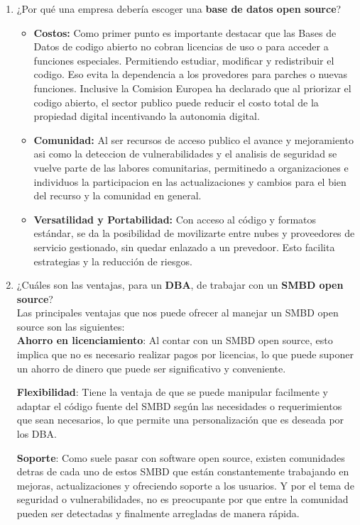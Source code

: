 \documentclass[12pt]{report}
\begin{document}
\begin{enumerate}[label=\roman*.]
\begin{enumerate}[label=\textbf{\arabic*.}, itemsep=2.0em]
  \item ¿Por qué una empresa debería escoger una \textbf{base de datos open source}?
 \begin{itemize}
      \item \textbf{Costos:}
            Como primer punto es importante destacar que las Bases de Datos de codigo abierto no cobran licencias de uso o para acceder a funciones especiales. Permitiendo estudiar, modificar y redistribuir el codigo. Eso evita la dependencia a los provedores para parches o nuevas funciones. Inclusive la Comision Europea ha declarado que al priorizar el codigo abierto, el sector publico puede reducir el costo total de la propiedad digital incentivando la autonomia digital.
        \item \textbf{Comunidad:}
            Al ser recursos de acceso publico el avance y mejoramiento asi como  la deteccion de vulnerabilidades y el analisis de seguridad se vuelve parte de las labores comunitarias, permitinedo a organizaciones e individuos la participacion en las actualizaciones y cambios para el bien del recurso y la comunidad en general.

        \item \textbf{Versatilidad y Portabilidad:}
            Con acceso al código y formatos estándar, se da la posibilidad de movilizarte entre nubes y proveedores de servicio gestionado, sin quedar enlazado a un prevedoor. Esto facilita estrategias y la reducción de riesgos.

\end{itemize}




  \item ¿Cuáles son las ventajas, para un \textbf{DBA}, de trabajar con un \textbf{SMBD open source}?\\
Las principales ventajas que nos puede ofrecer al manejar un SMBD open source son las siguientes:\\
\textbf{Ahorro en licenciamiento}: Al contar con un SMBD open source, esto implica que no es necesario realizar pagos por licencias, lo que puede suponer un ahorro de dinero que puede ser significativo y conveniente.

\textbf{Flexibilidad}: Tiene la ventaja de que se puede manipular facilmente y adaptar el código fuente del SMBD según las necesidades o requerimientos que sean necesarios, lo que permite una personalización que es deseada por los DBA.

\textbf{Soporte}: Como suele pasar con software open source, existen comunidades detras de cada uno de estos SMBD que están constantemente trabajando en mejoras, actualizaciones y ofreciendo soporte a los usuarios. Y por el tema de seguridad o vulnerabilidades, no es preocupante por que entre la comunidad pueden ser detectadas y finalmente arregladas de manera rápida.


\end{enumerate}
\end{enumerate}
\end{document}
